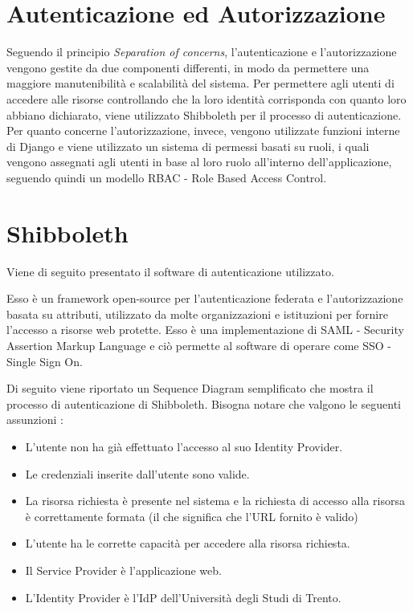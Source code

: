 \section{Autenticazione ed Autorizzazione}
Seguendo il principio \textit{Separation of concerns}, l'autenticazione e l'autorizzazione vengono gestite da due componenti differenti, in modo da permettere una maggiore manutenibilità e scalabilità del sistema.
Per permettere agli utenti di accedere alle risorse controllando che la loro identità corrisponda con quanto loro abbiano dichiarato, viene utilizzato Shibboleth per il processo di autenticazione. Per quanto concerne l'autorizzazione, invece, vengono utilizzate funzioni interne di Django e viene utilizzato un sistema di permessi basati su ruoli, i quali vengono assegnati agli utenti in base al loro ruolo all'interno dell'applicazione, seguendo quindi un modello RBAC - Role Based Access Control.



\section{Shibboleth}
Viene di seguito presentato il software di autenticazione utilizzato. 


Esso è un framework open-source per l'autenticazione federata e l'autorizzazione basata su attributi, utilizzato da molte organizzazioni e istituzioni per fornire l'accesso a risorse web protette. Esso è una implementazione di SAML - Security Assertion Markup Language e ciò permette al software di operare come SSO - Single Sign On. \cite{shibboleth}

Di seguito viene riportato un Sequence Diagram semplificato che mostra il processo di autenticazione di Shibboleth. Bisogna notare che valgono le seguenti assunzioni :
\begin{itemize}
    \item L'utente non ha già effettuato l'accesso al suo Identity Provider.
    \item Le credenziali inserite dall'utente sono valide.
    \item La risorsa richiesta è presente nel sistema e la richiesta di accesso alla risorsa è correttamente formata (il che significa che l'URL fornito è valido)
    \item L'utente ha le corrette capacità per accedere alla risorsa richiesta.
    \item Il Service Provider è l'applicazione web.
    \item L'Identity Provider è l'IdP dell'Università degli Studi di Trento.
\end{itemize}
\newpage


